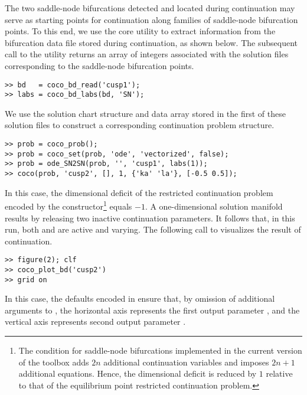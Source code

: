 The two saddle-node bifurcations detected and located during continuation may serve as starting points for continuation along families of saddle-node bifurcation points. To this end, we use the  core utility to extract information from the bifurcation data file stored during continuation, as shown below. The subsequent call to the  utility returns an array of integers associated with the solution files corresponding to the saddle-node bifurcation points.
\begin{lstlisting}[language=coco-highlight]
>> bd   = coco_bd_read('cusp1');
>> labs = coco_bd_labs(bd, 'SN');
\end{lstlisting}
We use the solution chart structure and data array stored in the first of these solution files to construct a corresponding continuation problem structure.
\begin{lstlisting}[language=coco-highlight]
>> prob = coco_prob();
>> prob = coco_set(prob, 'ode', 'vectorized', false);
>> prob = ode_SN2SN(prob, '', 'cusp1', labs(1));
>> coco(prob, 'cusp2', [], 1, {'ka' 'la'}, [-0.5 0.5]);
\end{lstlisting}
In this case, the dimensional deficit of the restricted continuation problem encoded by the  constructor\footnote{The condition for saddle-node bifurcations implemented in the current version of the  toolbox adds $2n$ additional continuation variables and imposes $2n+1$ additional equations. Hence, the dimensional deficit is reduced by $1$ relative to that of the equilibrium point restricted continuation problem.} equals $-1$. A one-dimensional solution manifold results by releasing two inactive continuation parameters. It follows that, in this run, both  and  are active and varying. The following call to  visualizes the result of continuation.
\begin{lstlisting}[language=coco-highlight]
>> figure(2); clf
>> coco_plot_bd('cusp2')
>> grid on
\end{lstlisting}
In this case, the defaults encoded in  ensure that, by omission of additional arguments to , the horizontal axis represents the first output parameter , and the vertical axis represents second output parameter .\\

